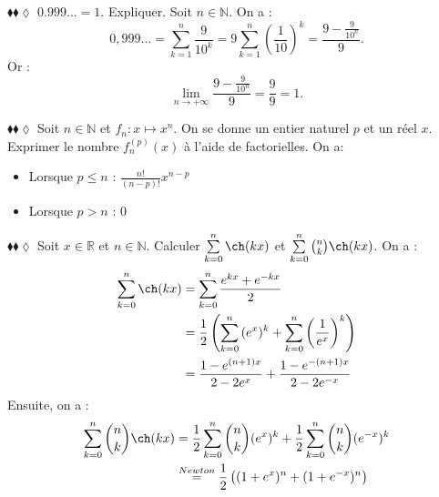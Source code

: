 \documentclass[11pt]{article}
\begin{document}
\begin{exercice}{$\blacklozenge\blacklozenge\lozenge$}{}
    $0.999...=1$. Expliquer.
    \tcblower
    Soit $n\in\mathbb{N}$. On a :
    \begin{equation*}
        0,999... = \sum\limits^{n}_{k=1}{\frac{9}{10^k}}=9\sum\limits^{n}_{k=1}{\left(\frac{1}{10}\right)^k}=\frac{9-\frac{9}{10^n}}{9}.
    \end{equation*}
    Or :
    \begin{equation*}
        \lim_{n\rightarrow+\infty}{\frac{9-\frac{9}{10^n}}{9}}=\frac{9}{9}=1.
    \end{equation*}
\end{exercice}

\begin{exercice}{$\blacklozenge\blacklozenge\lozenge$}{}
    Soit $n\in\mathbb{N}$ et $f_n:x\mapsto x^n$. On se donne un entier naturel $p$ et un réel $x$.\\
    Exprimer le nombre $f_{n}^{(p)}(x)$ à l'aide de factorielles.
    \tcblower
    On a:
    \begin{itemize}
        \item Lorsque $p\leq n$ : $\frac{n!}{(n-p)!}x^{n-p}$
        \item Lorsque $p>n$ : 0
    \end{itemize}
\end{exercice}


\begin{exercice}{$\blacklozenge\blacklozenge\lozenge$}{}
    Soit $x\in\mathbb{R}$ et $n\in\mathbb{N}$. Calculer $\sum\limits^{n}_{k=0}{\ch(kx)}$ et $\sum\limits^{n}_{k=0}{\binom{n}{k}\ch(kx)}$.
    \tcblower
    On a :
    \begin{align*}
        \sum\limits^{n}_{k=0}{\ch(kx)}&=\sum\limits^{n}_{k=0}{\frac{e^{kx}+e^{-kx}}{2}}\\
        &=\frac{1}{2}\left(\sum\limits^{n}_{k=0}{(e^x)^k}+\sum\limits^{n}_{k=0}{\left(\frac{1}{e^x}\right)^{k}}\right)\\
        &=\frac{1-e^{(n+1)x}}{2-2e^x}+\frac{1-e^{-(n+1)x}}{2-2e^{-x}}
    \end{align*}
    Ensuite, on a :
    \begin{align*}
        \sum\limits^{n}_{k=0}{\binom{n}{k}\ch(kx)}&=\frac{1}{2}\sum\limits^{n}_{k=0}{\binom{n}{k}(e^x)^k+\frac{1}{2}\sum\limits^{n}_{k=0}{\binom{n}{k}{(e^{-x})^k}}}\\
        &\stackrel{Newton}{=}\frac{1}{2}\left((1+e^x)^n+(1+e^{-x})^n\right)\\
    \end{align*}
\end{exercice}
\end{document}
